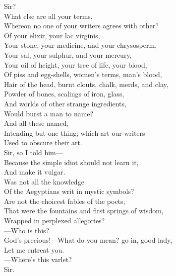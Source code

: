 \documentclass[a4paper,oneside,12pt]{memoir}
\begin{document}
\begin{drama*}
\subtlespeaks {} Sir?\\
\surlyspeaks {} What else are all your terms,\\
Whereon no one of your writers agrees with other?\\
Of your elixir, your lac virginis,\\
Your stone, your medicine, and your chrysosperm,\\
Your sal, your sulphur, and your mercury,\\
Your oil of height, your tree of life, your blood,\\
Of piss and egg-shells, women's terms, man's blood,\\
Hair of the head, burnt clouts, chalk, merds, and clay,\\
Powder of bones, scalings of iron, glass,\\
And worlds of other strange ingredients,\\
Would burst a man to name?\\
\subtlespeaks {} And all these named,\\
Intending but one thing; which art our writers\\
Used to obscure their art.\\
\mammonspeaks {} Sir, so I told him---\\
Because the simple idiot should not learn it,\\
And make it vulgar.\\
\subtlespeaks {} Was not all the knowledge\\
Of the Aegyptians writ in mystic symbols?\\
Are not the choicest fables of the poets,\\
That were the fountains and first springs of wisdom,\\
Wrapped in perplexed allegories?\\
\mammonspeaks {} ---Who is this?\\
\subtlespeaks God's precious!---What do you mean? go in, good lady,\\
Let me entreat you.\\
 ---Where's this varlet?\\
\facespeaks {} Sir.\\

\end{drama*}
\end{document}
